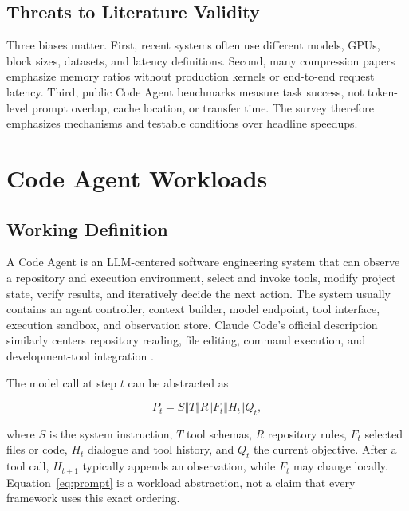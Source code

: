 \documentclass[conference,10pt]{IEEEtran}
\begin{document}
\subsection{Threats to Literature Validity}

Three biases matter. First, recent systems often use different models, GPUs, block sizes, datasets, and latency definitions. Second, many compression papers emphasize memory ratios without production kernels or end-to-end request latency. Third, public Code Agent benchmarks measure task success, not token-level prompt overlap, cache location, or transfer time. The survey therefore emphasizes mechanisms and testable conditions over headline speedups.

\section{Code Agent Workloads}

\subsection{Working Definition}

A Code Agent is an LLM-centered software engineering system that can observe a repository and execution environment, select and invoke tools, modify project state, verify results, and iteratively decide the next action. The system usually contains an agent controller, context builder, model endpoint, tool interface, execution sandbox, and observation store. Claude Code's official description similarly centers repository reading, file editing, command execution, and development-tool integration \cite{d11anthropic}.

The model call at step $t$ can be abstracted as

\begin{equation}
P_t = S \Vert T \Vert R \Vert F_t \Vert H_t \Vert Q_t,
\label{eq:prompt}
\end{equation}

where $S$ is the system instruction, $T$ tool schemas, $R$ repository rules, $F_t$ selected files or code, $H_t$ dialogue and tool history, and $Q_t$ the current objective. After a tool call, $H_{t+1}$ typically appends an observation, while $F_t$ may change locally. Equation~\ref{eq:prompt} is a workload abstraction, not a claim that every framework uses this exact ordering.
\end{document}

